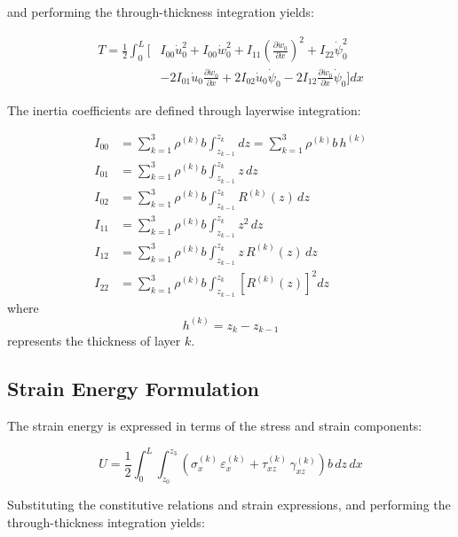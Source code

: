 \documentclass[12pt,a4paper]{report}
\begin{document}
and performing the through-thickness integration yields:

\begin{align}
T = \frac{1}{2} \int_0^L \Big[ & I_{00}\dot{u}_0^2 + I_{00}\dot{w}_0^2 
+ I_{11}\left(\frac{\partial \dot{w}_0}{\partial x}\right)^2 + I_{22}\dot{\psi}_0^2 \nonumber \\
& - 2I_{01}\dot{u}_0\frac{\partial \dot{w}_0}{\partial x} 
+ 2I_{02}\dot{u}_0\dot{\psi}_0 
- 2I_{12}\frac{\partial \dot{w}_0}{\partial x}\dot{\psi}_0 \Big] dx
\end{align}


The inertia coefficients are defined through layerwise integration:

\begin{align}
I_{00} &= \sum_{k=1}^{3} \rho^{(k)} b \int_{z_{k-1}}^{z_k} dz 
       = \sum_{k=1}^{3} \rho^{(k)} b \, h^{(k)} \\[6pt]
I_{01} &= \sum_{k=1}^{3} \rho^{(k)} b \int_{z_{k-1}}^{z_k} z \, dz \\[6pt]
I_{02} &= \sum_{k=1}^{3} \rho^{(k)} b \int_{z_{k-1}}^{z_k} R^{(k)}(z) \, dz \\[6pt]
I_{11} &= \sum_{k=1}^{3} \rho^{(k)} b \int_{z_{k-1}}^{z_k} z^2 \, dz \\[6pt]
I_{12} &= \sum_{k=1}^{3} \rho^{(k)} b \int_{z_{k-1}}^{z_k} z \, R^{(k)}(z) \, dz \\[6pt]
I_{22} &= \sum_{k=1}^{3} \rho^{(k)} b \int_{z_{k-1}}^{z_k} \left[ R^{(k)}(z) \right]^2 dz
\end{align}
where 
\begin{equation}
h^{(k)} = z_k - z_{k-1}
\end{equation}
represents the thickness of layer $k$.

\subsection*{Strain Energy Formulation}

The strain energy is expressed in terms of the stress and strain components:

\begin{equation}
U = \frac{1}{2} \int_0^L \int_{z_0}^{z_3} 
\left( \sigma_x^{(k)} \, \varepsilon_x^{(k)} 
     + \tau_{xz}^{(k)} \, \gamma_{xz}^{(k)} \right) 
b \, dz \, dx
\end{equation}

Substituting the constitutive relations and strain expressions, and performing the through-thickness integration yields:
\end{document}
